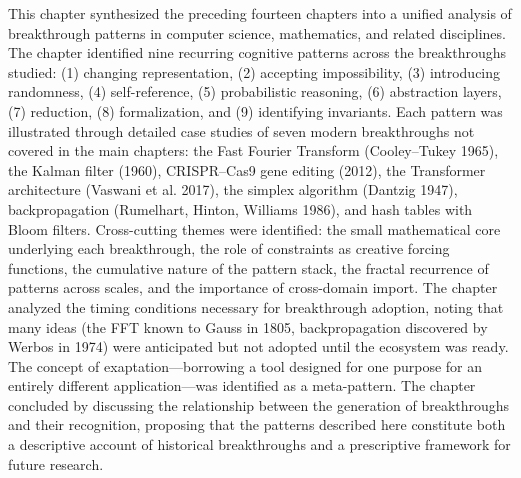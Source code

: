 This chapter synthesized the preceding fourteen chapters into a unified analysis of breakthrough patterns in computer science, mathematics, and related disciplines. The chapter identified nine recurring cognitive patterns across the breakthroughs studied: (1) changing representation, (2) accepting impossibility, (3) introducing randomness, (4) self-reference, (5) probabilistic reasoning, (6) abstraction layers, (7) reduction, (8) formalization, and (9) identifying invariants. Each pattern was illustrated through detailed case studies of seven modern breakthroughs not covered in the main chapters: the Fast Fourier Transform (Cooley--Tukey 1965), the Kalman filter (1960), CRISPR--Cas9 gene editing (2012), the Transformer architecture (Vaswani et al. 2017), the simplex algorithm (Dantzig 1947), backpropagation (Rumelhart, Hinton, Williams 1986), and hash tables with Bloom filters. Cross-cutting themes were identified: the small mathematical core underlying each breakthrough, the role of constraints as creative forcing functions, the cumulative nature of the pattern stack, the fractal recurrence of patterns across scales, and the importance of cross-domain import. The chapter analyzed the timing conditions necessary for breakthrough adoption, noting that many ideas (the FFT known to Gauss in 1805, backpropagation discovered by Werbos in 1974) were anticipated but not adopted until the ecosystem was ready. The concept of exaptation---borrowing a tool designed for one purpose for an entirely different application---was identified as a meta-pattern. The chapter concluded by discussing the relationship between the generation of breakthroughs and their recognition, proposing that the patterns described here constitute both a descriptive account of historical breakthroughs and a prescriptive framework for future research.

